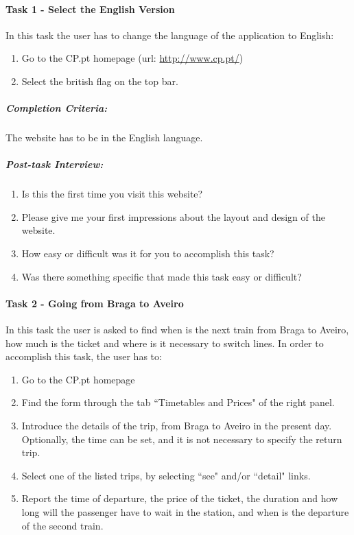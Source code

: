 \documentclass[a4paper]{article}
\begin{document}
\paragraph{Task 1 - Select the English Version} In this task the user has to change the language of the application to English:

\begin{enumerate}[label=\roman*.]
  \item Go to the CP.pt homepage (url: \url{http://www.cp.pt/}) 
  \item Select the british flag on the top bar.
\end{enumerate}
\subparagraph{Completion Criteria:} The website has to be in the English language.

\subparagraph{Post-task Interview:}

\begin{enumerate}[label=1.\theenumi .]
  \item Is this the first time you visit this website?
  \item Please give me your first impressions about the layout and design of the website.
  \item How easy or difficult was it for you to accomplish this task?
  \item Was there something specific that made this task easy or difficult?
\end{enumerate}

\paragraph{Task 2 - Going from Braga to Aveiro} In this task the user is asked to find when is the next train from Braga to Aveiro, how much is the ticket and where is it necessary to switch lines. In order to accomplish this task, the user has to:

\begin{enumerate}[label=\roman*.]
  \item Go to the CP.pt homepage
  \item Find the form through the tab ``Timetables and Prices" of the right panel.
  \item Introduce the details of the trip, from Braga to Aveiro in the present day. Optionally, the time can be set, and it is not necessary to specify the return trip.
  \item Select one of the listed trips, by selecting ``see" and/or ``detail" links. 
  \item Report the time of departure, the price of the ticket, the duration and how long will the passenger have to wait in the station, and when is the departure of the second train.
\end{enumerate}
\end{document}
